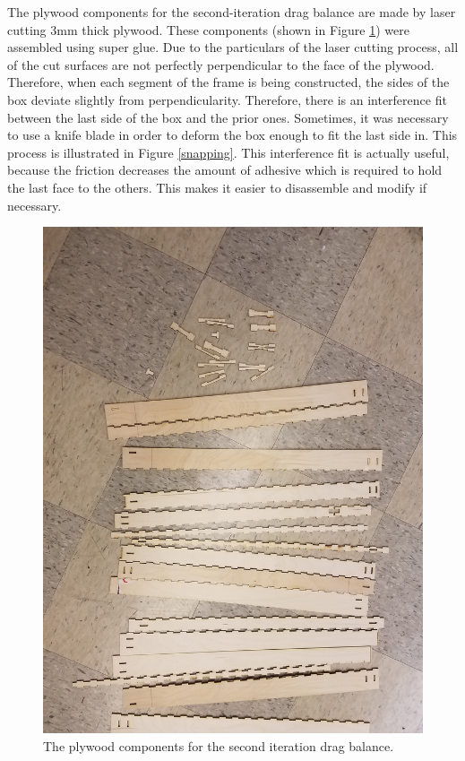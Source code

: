 \documentclass[12pt]{report} %
\begin{document}
The plywood components for the second-iteration drag balance are made by laser cutting 3mm thick plywood. These components (shown
in Figure \ref{parts}) were assembled using super glue. Due to the particulars of the laser cutting process, all of the cut surfaces
are not perfectly perpendicular to the face of the plywood. Therefore, when each segment of the frame is being constructed, the
sides of the box deviate slightly from perpendicularity. Therefore, there is an interference fit between the last side of the box
and the prior ones. Sometimes, it was necessary to use a knife blade in order to deform the box enough to fit the last side in. This
process is illustrated in Figure \ref{snapping}. This interference fit is actually useful, because the friction decreases the amount
of adhesive which is required to hold the last face to the others. This makes it easier to disassemble and modify if necessary.

\begin{figure}
\includegraphics[width = 0.7\linewidth]{parts.jpg}
\centering
\caption{The plywood components for the second iteration drag balance.}
\label{parts}
\end{figure}
\end{document}
